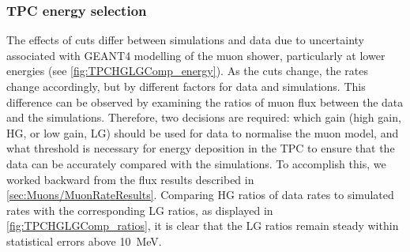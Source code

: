 \subsubsection{TPC energy selection}
The effects of cuts differ between simulations and data due to uncertainty associated with GEANT4 modelling of the muon shower, particularly at lower energies (see \autoref{fig:TPCHGLGComp_energy}). As the cuts change, the rates change accordingly, but by different factors for data and simulations. This difference can be observed by examining the ratios of muon flux between the data and the simulations. Therefore, two decisions are required: which gain (high gain, HG, or low gain, LG) should be used for data to normalise the muon model, and what threshold is necessary for energy deposition in the TPC to ensure that the data can be accurately compared with the simulations. To accomplish this, we worked backward from the flux results described in \autoref{sec:Muons/MuonRateResults}. Comparing HG ratios of data rates to simulated rates with the corresponding LG ratios, as displayed in \autoref{fig:TPCHGLGComp_ratios}, it is clear that the LG ratios remain steady within statistical errors above 10~MeV. 

